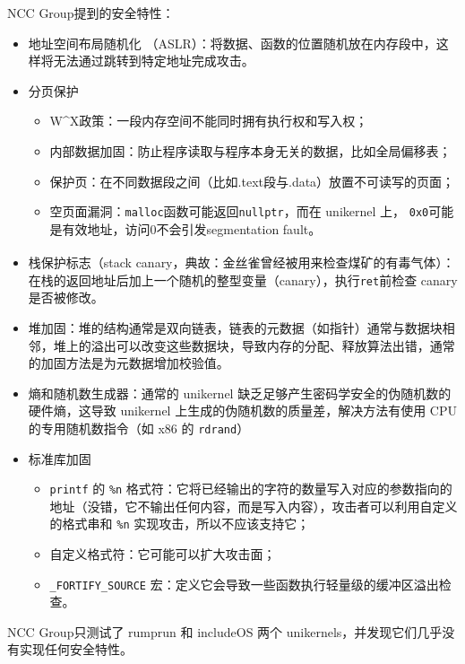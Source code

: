 \documentclass[UTF8,fontset=none,linespread=1.15]{ctexart}
\let\nosupcite\cite
\renewcommand*{\cite}[1]{\textsuperscript{\nosupcite{#1}}}
\begin{document}
NCC Group提到的安全特性：
\begin{itemize}
\item 地址空间布局随机化 （ASLR）：将数据、函数的位置随机放在内存段中，这样将无法通过跳转到特定地址完成攻击。
\item 分页保护
    \begin{itemize}
    \item W\^{}X政策：一段内存空间不能同时拥有执行权和写入权；
    \item 内部数据加固：防止程序读取与程序本身无关的数据，比如全局偏移表；
    \item 保护页：在不同数据段之间（比如.text段与.data）放置不可读写的页面；
    \item 空页面漏洞：\texttt{malloc}函数可能返回\texttt{nullptr}，而在 unikernel 上，
    \texttt{0x0}可能是有效地址，访问0不会引发segmentation fault。
    \end{itemize}
\item 栈保护标志（stack canary，典故：金丝雀曾经被用来检查煤矿的有毒气体\cite{bib:canary}）：在栈的返回地址后加上一个随机的整型变量（canary），执行\texttt{ret}前检查 canary 是否被修改。
\item 堆加固：堆的结构通常是双向链表，链表的元数据（如指针）通常与数据块相邻，堆上的溢出可以改变这些数据块，导致内存的分配、释放算法出错，通常的加固方法是为元数据增加校验值。
\item 熵和随机数生成器：通常的 unikernel 缺乏足够产生密码学安全的伪随机数的硬件熵，这导致 unikernel 上生成的伪随机数的质量差，解决方法有使用 CPU 的专用随机数指令（如 x86 的 \texttt{rdrand}）
\item 标准库加固
    \begin{itemize}
    \item \texttt{printf} 的 \texttt{\%n} 格式符：它将已经输出的字符的数量写入对应的参数指向的地址（没错，它不输出任何内容，而是写入内容），攻击者可以利用自定义的格式串和 \texttt{\%n} 实现攻击，所以不应该支持它；
    \item 自定义格式符：它可能可以扩大攻击面；
    \item \texttt{\_FORTIFY\_SOURCE} 宏：定义它会导致一些函数执行轻量级的缓冲区溢出检查。
    \end{itemize}
\end{itemize}
NCC Group只测试了 rumprun 和 includeOS 两个 unikernels，并发现它们几乎没有实现任何安全特性。
\end{document}
